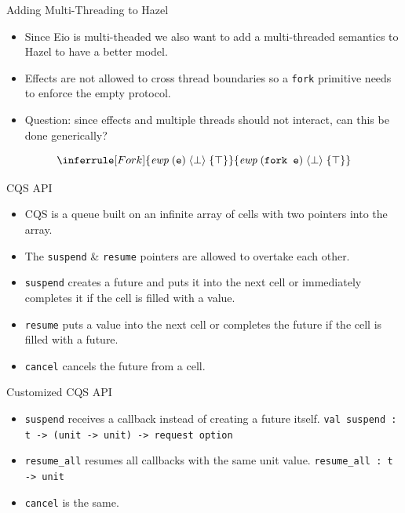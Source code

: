 \documentclass[aspectratio=43]{beamer}
\newcommand{\ocaml}[1]{\texttt{#1}}
\newcommand{\ewp}[3]{\textit{ewp}\; (#1)\; \langle #2 \rangle\; \{#3\}}
\begin{document}
\begin{frame}{Adding Multi-Threading to Hazel}
    \begin{itemize}
        \item Since Eio is multi-theaded we also want to add a multi-threaded semantics to Hazel to have a better model.
        \item Effects are not allowed to cross thread boundaries so a \ocaml{fork} primitive needs to enforce the empty protocol.
        \item Question: since effects and multiple threads should not interact, can this be done generically?
    \end{itemize}
    \[
        \inferrule [Fork]
        {\ewp{\texttt{e}}{\bot}{\top}}
        {\ewp{\texttt{fork e}}{\bot}{\top}}
    \]
\end{frame}

\begin{frame}{CQS API}
    \begin{itemize}
        \item CQS is a queue built on an infinite array of cells with two pointers into the array.
        \item The \ocaml{suspend} \& \ocaml{resume} pointers are allowed to overtake each other.
        \item \ocaml{suspend} creates a future and puts it into the next cell or immediately completes it if the cell is filled with a value.
        \item \ocaml{resume} puts a value into the next cell or completes the future if the cell is filled with a future.
        \item \ocaml{cancel} cancels the future from a cell.
    \end{itemize}
\end{frame}

\begin{frame}{Customized CQS API}
    \begin{itemize}
        \item \ocaml{suspend} receives a callback instead of creating a future itself.\newline
              \texttt{val suspend : t -> (unit -> unit) -> request option}
        \item \ocaml{resume_all} resumes all callbacks with the same unit value.\newline
              \texttt{resume_all : t -> unit}
        \item \ocaml{cancel} is the same.
    \end{itemize}
\end{frame}
\end{document}
